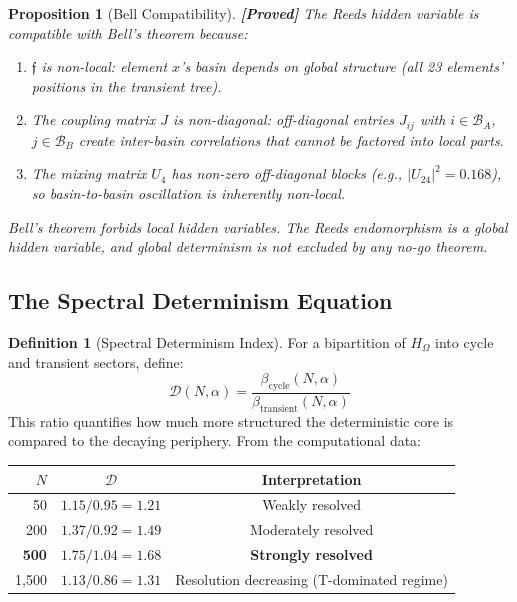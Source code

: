 \documentclass[12pt,a4paper]{article}
\newcommand{\proved}[1]{\textcolor{proved}{\textbf{[Proved]}} #1}
\newtheorem{proposition}[theorem]{Proposition}
\theoremstyle{definition}
\newtheorem{definition}[theorem]{Definition}
\theoremstyle{remark}
\newcommand{\Reeds}{\mathfrak{f}}
\newcommand{\Basin}{\mathcal{B}}
\newcommand{\Umix}{U_4}
\newcommand{\Jcoup}{J}
\newcommand{\HOmega}{H_\Omega}
\begin{document}
\begin{proposition}[Bell Compatibility]
\label{prop:bell_compat}
\proved{The Reeds hidden variable is compatible with Bell's theorem because:}
\begin{enumerate}
  \item $\Reeds$ is \emph{non-local}: element $x$'s basin depends on global
  structure (all 23 elements' positions in the transient tree).
  \item The coupling matrix $\Jcoup$ is \emph{non-diagonal}: off-diagonal entries
  $\Jcoup_{ij}$ with $i \in \Basin_A$, $j \in \Basin_B$ create inter-basin
  correlations that cannot be factored into local parts.
  \item The mixing matrix $\Umix$ has non-zero off-diagonal blocks (e.g.,
  $|U_{24}|^2 = 0.168$), so basin-to-basin oscillation is inherently non-local.
\end{enumerate}
Bell's theorem forbids local hidden variables. The Reeds endomorphism is a
\emph{global} hidden variable, and global determinism is not excluded by any
no-go theorem.
\end{proposition}

\subsection{The Spectral Determinism Equation}

\begin{definition}[Spectral Determinism Index]
\label{def:sdi}
For a bipartition of $\HOmega$ into cycle and transient sectors, define:
\begin{equation}
  \mathcal{D}(N, \alpha) = \frac{\beta_{\text{cycle}}(N, \alpha)}{\beta_{\text{transient}}(N, \alpha)}
\end{equation}
This ratio quantifies how much more structured the deterministic core is compared
to the decaying periphery. From the computational data:
\begin{center}
\begin{tabular}{rcc}
\toprule
$N$ & $\mathcal{D}$ & Interpretation \\
\midrule
50 & $1.15/0.95 = 1.21$ & Weakly resolved \\
200 & $1.37/0.92 = 1.49$ & Moderately resolved \\
\textbf{500} & $\mathbf{1.75/1.04 = 1.68}$ & \textbf{Strongly resolved} \\
1{,}500 & $1.13/0.86 = 1.31$ & Resolution decreasing (T-dominated regime) \\
\bottomrule
\end{tabular}
\end{center}
\end{definition}
\end{document}
